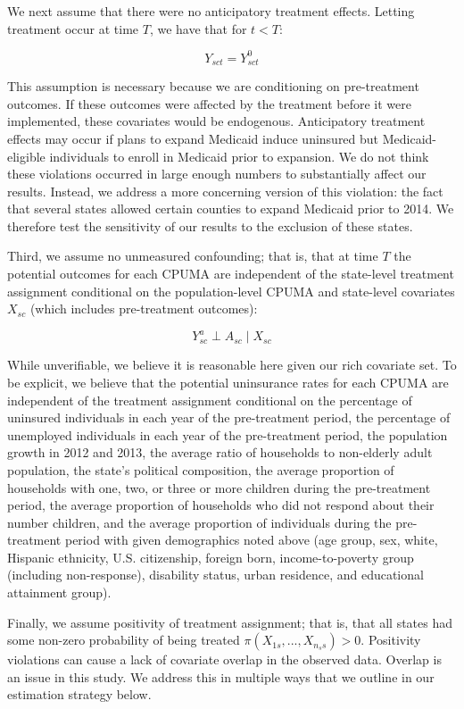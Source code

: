 \documentclass{article}
\begin{document}
We next assume that there were no anticipatory treatment effects. Letting treatment occur at time $T$, we have that for $t < T$:

$$
Y_{sct} = Y_{sct}^0
$$

This assumption is necessary because we are conditioning on pre-treatment outcomes. If these outcomes were affected by the treatment before it were implemented, these covariates would be endogenous. Anticipatory treatment effects may occur if plans to expand Medicaid induce uninsured but Medicaid-eligible individuals to enroll in Medicaid prior to expansion. We do not think these violations occurred in large enough numbers to substantially affect our results. Instead, we address a more concerning version of this violation: the fact that several states allowed certain counties to expand Medicaid prior to 2014. We therefore test the sensitivity of our results to the exclusion of these states.

Third, we assume no unmeasured confounding; that is, that at time $T$ the potential outcomes for each CPUMA are independent of the state-level treatment assignment conditional on the population-level CPUMA and state-level covariates $X_{sc}$ (which includes pre-treatment outcomes):

$$
Y_{sc}^a \perp A_{sc} \mid X_{sc}
$$

While unverifiable, we believe it is reasonable here given our rich covariate set. To be explicit, we believe that the potential uninsurance rates for each CPUMA are independent of the treatment assignment conditional on the percentage of uninsured individuals in each year of the pre-treatment period, the percentage of unemployed individuals in each year of the pre-treatment period, the population growth in 2012 and 2013, the average ratio of households to non-elderly adult population, the state's political composition, the average proportion of households with one, two, or three or more children during the pre-treatment period, the average proportion of households who did not respond about their number children, and the average proportion of individuals during the pre-treatment period with given demographics noted above (age group, sex, white, Hispanic ethnicity, U.S. citizenship, foreign born, income-to-poverty group (including non-response), disability status, urban residence, and educational attainment group). 

Finally, we assume positivity of treatment assignment; that is, that all states had some non-zero probability of being treated $\pi(X_{1s}, ..., X_{n_ss}) > 0$. Positivity violations can cause a lack of covariate overlap in the observed data. Overlap is an issue in this study. We address this in multiple ways that we outline in our estimation strategy below. 
\end{document}
